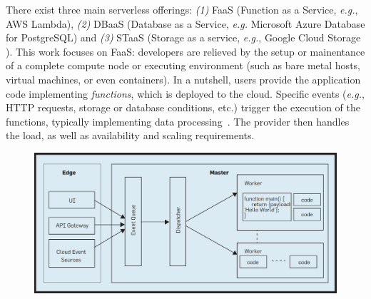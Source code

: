 There exist three main serverless offerings: \emph{(1)} FaaS (Function as a Service, \emph{e.g.}, \gls{AWS} Lambda), \emph{(2)} DBaaS (Database as a Service, \emph{e.g.} Microsoft Azure Database for PostgreSQL) and \emph{(3)} STaaS (Storage as a service, \emph{e.g.}, Google Cloud Storage \cite{serverlessgoogle}). 
This work focuses on \gls{FaaS}: developers are relieved  by the setup or mainentance of a complete compute node or executing environment (such as bare metal hosts, virtual machines, or even containers). %
In a nutshell, users provide the application code implementing \emph{functions}, which is deployed to the cloud.
Specific events  (\emph{e.g.}, \gls{HTTP} requests, storage or database conditions, etc.) trigger the execution of the functions, typically implementing data processing~\cite{AWSLambda, GoogleFunctions}.
The provider then handles the load, as well as availability and scaling requirements. %

\begin{figure}[!t]
\begin{center}
\includegraphics[scale=0.2]{bilder/FaaS_architecture.png}
\captionsetup[table]{justification=centering, labelfont=bf}
\caption{\cite{riseofserverless}}
\label{fig:faas_achritecture}
\end{center}
\end{figure}

